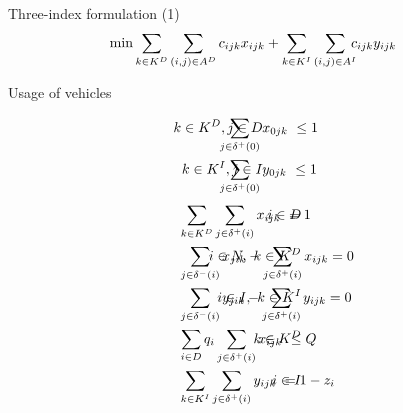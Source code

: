 \documentclass[9pt,xcolor={dvipsnames}]{beamer}
\begin{document}
\iffalse
\begin{frame}[shrink=20]{Three-index formulation (1)}
\begin{align}
\label{model:obj} \min  &  \sum_{k \in K^{D}}\sum_{(i,j) \in A^D} c_{ijk}x_{ijk} + \sum_{k \in K^{I}}\sum_{(i,j) \in A^I} \hspace{-2mm}c_{ijk}y_{ijk} 
\end{align}
\begin{tcolorbox}[colback=red!5!white,colframe=red!75!black]
Usage of vehicles
\vspace{-2mm}
\end{tcolorbox}

\begin{align}
\label{c20} & \sum_{j \in \delta^{+}(0)}x_{0jk}\ \leq 1 & \hspace{-40mm}  k \in K^{D},j \in D \hspace{10mm}   \\
\label{c21} & \sum_{j \in \delta^{+}(0)}y_{0jk}\ \leq 1 & \hspace{-40mm}  k \in K^{I},j \in I \hspace{10mm} 
\end{align}
\begin{align}
\label{c22} & \sum_{k \in K^{D}}\sum_{j \in \delta^{+}(i)}x_{ijk}\ = 1 & \hspace{-40mm}   i \in D \hspace{10mm}  \\
\label{c23} & \sum_{j \in \delta^{-}(i)}x_{jik} - \sum_{j \in \delta^{+}(i)}x_{ijk} = 0 &\hspace{-40mm}   i \in N ,\ k \in K^{D} \hspace{10mm} \\
\label{c24} & \sum_{j \in \delta^{-}(i)}y_{jik} - \sum_{j \in \delta^{+}(i)}y_{ijk} = 0 & \hspace{-40mm}  i \in I ,\ k \in K^{I} \hspace{10mm}  \\
\label{c25} & \sum_{i \in D}q_{i} \sum_{j \in \delta^{+}(i)}x_{ijk}\ \leq Q & \hspace{-40mm}   k \in K^{D} \hspace{10mm}  \\
\label{c27} & \sum_{k \in K^{I}}\sum_{j \in \delta^{+}(i)}y_{ijk}\ = 1 - z_{i} & \hspace{-40mm}  i \in I \hspace{10mm}
\end{align}

\end{frame}
\end{document}
